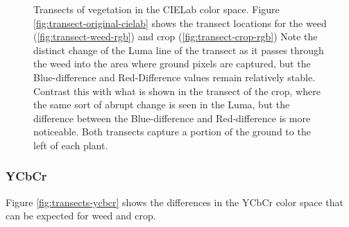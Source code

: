 \documentclass[letterpaper, notitlepage]{report}
\begin{document}
\begin{figure}[h]
	\centering
	\hfill
	\hfill
	\caption[CIELab Transects]{Transects of vegetation in the CIELab color space. Figure \ref{fig:transect-original-cielab} shows the transect locations for the weed (\ref{fig:transect-weed-rgb}) and crop (\ref{fig:transect-crop-rgb}) Note the distinct change of the Luma line of the transect as it passes through the weed into the area where ground pixels are captured, but the Blue-difference and Red-Difference values remain relatively stable. Contrast this with what is shown in the transect of the crop, where the same sort of abrupt change is seen in the Luma, but the difference between the Blue-difference and Red-difference is more noticeable. Both transects capture a portion of the ground to the left of each plant.}
	\label{fig:transects-cielab}
\end{figure}

\subsubsection{YCbCr}
Figure \ref{fig:transects-ycbcr} shows the differences in the YCbCr color space that can be expected for weed and crop.
\end{document}
